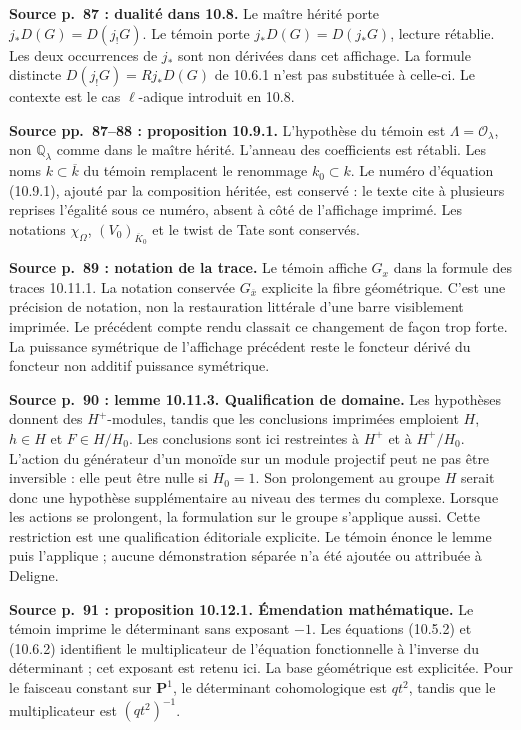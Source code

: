 \documentclass[10pt,letterpaper]{article}
\newcommand{\Q}{\mathbb Q}
\begin{document}
\begin{description}[style=nextline,leftmargin=2.6em,labelwidth=2.2em,font=\normalfont\bfseries]
\item[E05] \textbf{Source p.~87 : dualité dans 10.8.} Le maître hérité porte \(j_*D(G)=D(j_!G)\). Le témoin porte \(j_*D(G)=D(j_*G)\), lecture rétablie. Les deux occurrences de \(j_*\) sont non dérivées dans cet affichage. La formule distincte \(D(j_!G)=Rj_*D(G)\) de 10.6.1 n'est pas substituée à celle-ci. Le contexte est le cas \(\ell\)-adique introduit en 10.8.

\item[E06] \textbf{Source pp.~87--88 : proposition 10.9.1.} L'hypothèse du témoin est \(\Lambda=\mathcal O_\lambda\), non \(\Q_\lambda\) comme dans le maître hérité. L'anneau des coefficients est rétabli. Les noms \(k\subset\overline k\) du témoin remplacent le renommage \(k_0\subset k\). Le numéro d'équation (10.9.1), ajouté par la composition héritée, est conservé : le texte cite à plusieurs reprises l'égalité sous ce numéro, absent à côté de l'affichage imprimé. Les notations \(\chi_\Omega\), \((V_0)_{\overline K_0}\) et le twist de Tate sont conservés.

\item[E07] \textbf{Source p.~89 : notation de la trace.} Le témoin affiche \(G_x\) dans la formule des traces 10.11.1. La notation conservée \(G_{\overline x}\) explicite la fibre géométrique. C'est une précision de notation, non la restauration littérale d'une barre visiblement imprimée. Le précédent compte rendu classait ce changement de façon trop forte. La puissance symétrique de l'affichage précédent reste le foncteur dérivé du foncteur non additif puissance symétrique.

\item[E08] \textbf{Source p.~90 : lemme 10.11.3. Qualification de domaine.} Les hypothèses donnent des \(H^+\)-modules, tandis que les conclusions imprimées emploient \(H\), \(h\in H\) et \(F\in H/H_0\). Les conclusions sont ici restreintes à \(H^+\) et à \(H^+/H_0\). L'action du générateur d'un monoïde sur un module projectif peut ne pas être inversible : elle peut être nulle si \(H_0=1\). Son prolongement au groupe \(H\) serait donc une hypothèse supplémentaire au niveau des termes du complexe. Lorsque les actions se prolongent, la formulation sur le groupe s'applique aussi. Cette restriction est une qualification éditoriale explicite. Le témoin énonce le lemme puis l'applique ; aucune démonstration séparée n'a été ajoutée ou attribuée à Deligne.

\item[E09] \textbf{Source p.~91 : proposition 10.12.1. Émendation mathématique.} Le témoin imprime le déterminant sans exposant \(-1\). Les équations (10.5.2) et (10.6.2) identifient le multiplicateur de l'équation fonctionnelle à l'inverse du déterminant ; cet exposant est retenu ici. La base géométrique est explicitée. Pour le faisceau constant sur \(\mathbf P^1\), le déterminant cohomologique est \(qt^2\), tandis que le multiplicateur est \((qt^2)^{-1}\).


\end{description}
\end{document}
